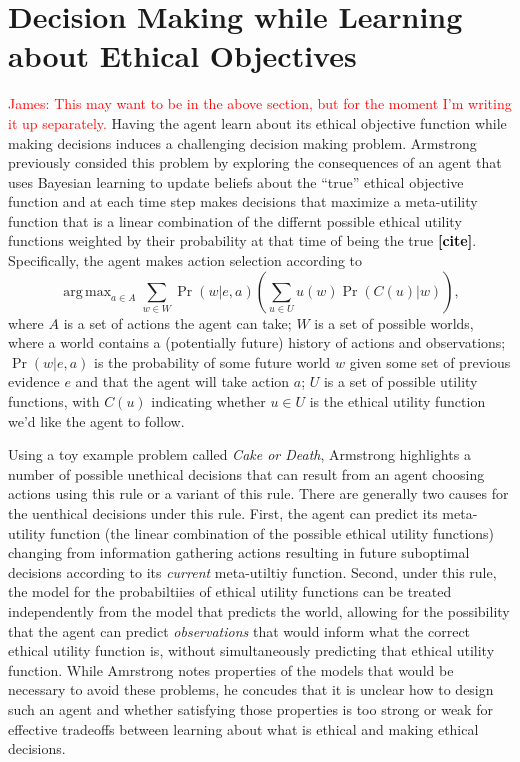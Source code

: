 \documentclass[11pt]{article}
\newcommand\jmnote[1]{\textcolor{red}{James: #1}}
\newcommand\ncite{\textcolor{black}{{\bf [cite]}}}
\DeclareMathOperator*{\argmax}{arg\,max}
\begin{document}
\section{Decision Making while Learning about Ethical Objectives}
\jmnote{This may want to be in the above section, but for the moment I'm writing it up separately.}
Having the agent learn about its ethical objective function while making decisions induces a challenging decision making problem. Armstrong previously consided this problem by exploring the consequences of an agent that uses Bayesian learning to update beliefs about the ``true'' ethical objective function and at each time step makes decisions that maximize a meta-utility function that is a linear combination of the differnt possible ethical utility functions weighted by their probability at that time of being the true \ncite. Specifically, the agent makes action selection according to
\begin{equation}
\label{eq:armstrong}
\argmax_{a \in A} \sum_{w \in W} \Pr(w | e, a) \left( \sum_{u \in U} u(w) \Pr(C(u)|w) \right),
\end{equation}
where $A$ is a set of actions the agent can take; $W$ is a set of possible worlds, where a world contains a (potentially future) history of actions and observations; $\Pr(w | e, a)$ is the probability of some future world $w$ given some set of previous evidence $e$ and that the agent will take action $a$; $U$ is a set of possible utility functions, with $C(u)$ indicating whether $u \in U$ is the ethical utility function we'd like the agent to follow.

Using a toy example problem called {\em Cake or Death}, Armstrong highlights a number of possible unethical decisions that can result from an agent choosing actions using this rule or a variant of this rule. There are generally two causes for the uenthical decisions under this rule. First, the agent can predict its meta-utility function (the linear combination of the possible ethical utility functions) changing from information gathering actions resulting in future suboptimal decisions according to its {\em current} meta-utiltiy function. Second, under this rule, the model for the probabiltiies of ethical utility functions can be treated independently from the model that predicts the world, allowing for the possibility that the agent can predict {\em observations} that would inform what the correct ethical utility function is, without simultaneously predicting that ethical utility function. While Amrstrong notes properties of the models that would be necessary to avoid these problems, he concudes that it is unclear how to design such an agent and whether satisfying those properties is too strong or weak for effective tradeoffs between learning about what is ethical and making ethical decisions.
\end{document}
